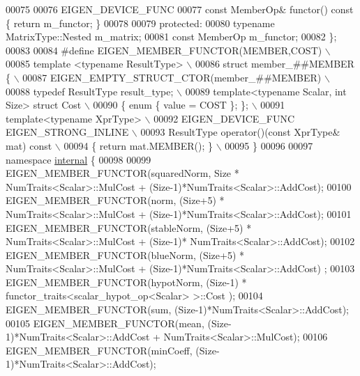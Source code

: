 \begin{DoxyCode}
00075 
00076     EIGEN\_DEVICE\_FUNC
00077     \textcolor{keyword}{const} MemberOp& functor()\textcolor{keyword}{ const }\{ \textcolor{keywordflow}{return} m\_functor; \}
00078 
00079   \textcolor{keyword}{protected}:
00080     \textcolor{keyword}{typename} MatrixType::Nested m\_matrix;
00081     \textcolor{keyword}{const} MemberOp m\_functor;
00082 \};
00083 
00084 \textcolor{preprocessor}{#define EIGEN\_MEMBER\_FUNCTOR(MEMBER,COST)                               \(\backslash\)}
00085 \textcolor{preprocessor}{  template <typename ResultType>                                        \(\backslash\)}
00086 \textcolor{preprocessor}{  struct member\_##MEMBER \{                                              \(\backslash\)}
00087 \textcolor{preprocessor}{    EIGEN\_EMPTY\_STRUCT\_CTOR(member\_##MEMBER)                            \(\backslash\)}
00088 \textcolor{preprocessor}{    typedef ResultType result\_type;                                     \(\backslash\)}
00089 \textcolor{preprocessor}{    template<typename Scalar, int Size> struct Cost                     \(\backslash\)}
00090 \textcolor{preprocessor}{    \{ enum \{ value = COST \}; \};                                         \(\backslash\)}
00091 \textcolor{preprocessor}{    template<typename XprType>                                          \(\backslash\)}
00092 \textcolor{preprocessor}{    EIGEN\_DEVICE\_FUNC EIGEN\_STRONG\_INLINE                               \(\backslash\)}
00093 \textcolor{preprocessor}{    ResultType operator()(const XprType& mat) const                     \(\backslash\)}
00094 \textcolor{preprocessor}{    \{ return mat.MEMBER(); \} \(\backslash\)}
00095 \textcolor{preprocessor}{  \}}
00096 
00097 \textcolor{keyword}{namespace }\hyperlink{namespaceinternal}{internal} \{
00098 
00099 EIGEN\_MEMBER\_FUNCTOR(squaredNorm, Size * NumTraits<Scalar>::MulCost + (Size-1)*NumTraits<Scalar>::AddCost);
00100 EIGEN\_MEMBER\_FUNCTOR(norm, (Size+5) * NumTraits<Scalar>::MulCost + (Size-1)*NumTraits<Scalar>::AddCost);
00101 EIGEN\_MEMBER\_FUNCTOR(stableNorm, (Size+5) * NumTraits<Scalar>::MulCost + (Size-1)*
      NumTraits<Scalar>::AddCost);
00102 EIGEN\_MEMBER\_FUNCTOR(blueNorm, (Size+5) * NumTraits<Scalar>::MulCost + (Size-1)*NumTraits<Scalar>::AddCost)
      ;
00103 EIGEN\_MEMBER\_FUNCTOR(hypotNorm, (Size-1) * functor\_traits<scalar\_hypot\_op<Scalar> >::Cost );
00104 EIGEN\_MEMBER\_FUNCTOR(sum, (Size-1)*NumTraits<Scalar>::AddCost);
00105 EIGEN\_MEMBER\_FUNCTOR(mean, (Size-1)*NumTraits<Scalar>::AddCost + NumTraits<Scalar>::MulCost);
00106 EIGEN\_MEMBER\_FUNCTOR(minCoeff, (Size-1)*NumTraits<Scalar>::AddCost);

\end{DoxyCode}
